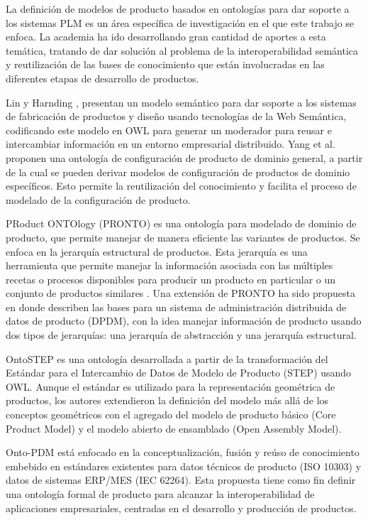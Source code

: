 \documentclass[journal]{IEEEtran}
\begin{document}
La definici\'on de modelos de producto basados en ontolog\'ias para dar soporte a los sistemas PLM es un \'area espec\'ifica de investigaci\'on en el que este trabajo se enfoca. La academia ha ido desarrollando gran cantidad de aportes a esta tem\'atica, tratando de dar soluci\'on al problema de la interoperabilidad sem\'antica y reutilizaci\'on de las bases de conocimiento que est\'an involucradas en las diferentes etapas de desarrollo de productos.

Lin y Harnding \cite{Lin2007}, presentan un modelo sem\'antico para dar soporte a los sistemas de fabricaci\'on de productos y dise\~no usando tecnolog\'ias de la Web Sem\'antica, codificando este modelo en OWL para generar un moderador para reusar e intercambiar informaci\'on en un entorno empresarial distribuido.
Yang et al. \cite{Yang2009} proponen una ontolog\'ia de configuraci\'on de producto de dominio general, a partir de la cual se pueden derivar modelos de configuraci\'on de productos de dominio espec\'ificos. Esto permite la reutilizaci\'on del conocimiento y facilita el proceso de modelado de la configuraci\'on de producto. 

PRoduct ONTOlogy (PRONTO) es una ontolog\'ia para modelado de dominio de producto, que permite manejar de manera eficiente las variantes de productos. Se enfoca en la jerarqu\'ia estructural de productos. Esta jerarqu\'ia es una herramienta que permite manejar la informaci\'on asociada con las m\'ultiples recetas o procesos disponibles para producir un producto en particular o un conjunto de productos similares \cite{Vegetti2005}. Una extensi\'on de PRONTO ha sido propuesta en \cite{Gimenez2006b} donde describen las bases para un sistema de administraci\'on distribuida de datos de producto (DPDM), con la idea manejar informaci\'on de producto usando dos tipos de jerarqu\'ias: una jerarqu\'ia de abstracci\'on y una jerarqu\'ia estructural. 

OntoSTEP \cite{ISOPrinciples} es una ontolog\'ia desarrollada a partir de la transformaci\'on del Est\'andar para el Intercambio de Datos de Modelo de Producto (STEP) usando OWL. Aunque el est\'andar es utilizado para la representaci\'on geom\'etrica de productos, los autores extendieron la definici\'on del modelo m\'as all\'a de los conceptos geom\'etricos con el agregado del modelo de producto b\'asico (Core Product Model) y el modelo abierto de ensamblado (Open Assembly Model). 

Onto-PDM \cite{Panetto2012} est\'a enfocado en la conceptualizaci\'on, fusi\'on y re\'uso de conocimiento embebido en est\'andares existentes para datos t\'ecnicos de producto (ISO 10303) y datos de sistemas ERP/MES (IEC 62264). Esta propuesta tiene como fin definir una ontolog\'ia formal de producto para alcanzar la interoperabilidad de aplicaciones empresariales, centradas en el desarrollo y producci\'on de productos.
\end{document}
